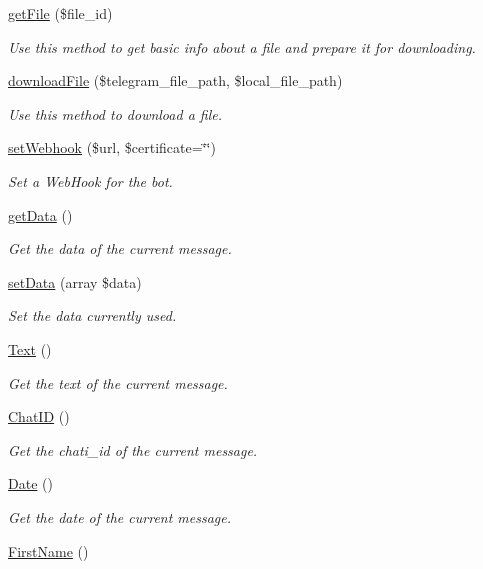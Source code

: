 \begin{DoxyCompactItemize}
\hyperlink{class_telegram_acb201ffc034063cfd347962c49ad5ad9}{get\+File} (\$file\+\_\+id)
\begin{DoxyCompactList}\small\item\em Use this method to get basic info about a file and prepare it for downloading. \end{DoxyCompactList}\item 
\hyperlink{class_telegram_af08c6bc7982d71857f05c0756221a703}{download\+File} (\$telegram\+\_\+file\+\_\+path, \$local\+\_\+file\+\_\+path)
\begin{DoxyCompactList}\small\item\em Use this method to download a file. \end{DoxyCompactList}\item 
\hyperlink{class_telegram_ae94b55864cae3e7751e7293585eec9f5}{set\+Webhook} (\$url, \$certificate=\char`\"{}\char`\"{})
\begin{DoxyCompactList}\small\item\em Set a Web\+Hook for the bot. \end{DoxyCompactList}\item 
\hyperlink{class_telegram_a81a67162a6288d78fc4c55283325f0b4}{get\+Data} ()
\begin{DoxyCompactList}\small\item\em Get the data of the current message. \end{DoxyCompactList}\item 
\hypertarget{class_telegram_a87449bdd364c33ff024d32896342bf31}{}\hyperlink{class_telegram_a87449bdd364c33ff024d32896342bf31}{set\+Data} (array \$data)\label{class_telegram_a87449bdd364c33ff024d32896342bf31}

\begin{DoxyCompactList}\small\item\em Set the data currently used. \end{DoxyCompactList}\item 
\hyperlink{class_telegram_a950a98ae75562dc9c6a458acbd330143}{Text} ()
\begin{DoxyCompactList}\small\item\em Get the text of the current message. \end{DoxyCompactList}\item 
\hyperlink{class_telegram_a4b624bab3560ed1e761aba1e7431cb6e}{Chat\+I\+D} ()
\begin{DoxyCompactList}\small\item\em Get the chati\+\_\+id of the current message. \end{DoxyCompactList}\item 
\hyperlink{class_telegram_aff49fc2cda4491ff4457ca481bb8edf9}{Date} ()
\begin{DoxyCompactList}\small\item\em Get the date of the current message. \end{DoxyCompactList}\item 
\hypertarget{class_telegram_a0e3e32188dd1631ed1ed673ac844d999}{}\hyperlink{class_telegram_a0e3e32188dd1631ed1ed673ac844d999}{First\+Name} ()\label{class_telegram_a0e3e32188dd1631ed1ed673ac844d999}


\end{DoxyCompactItemize}
